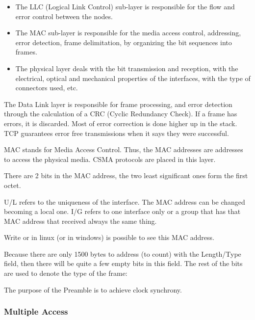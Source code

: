 \begin{itemize}
    \item The LLC (Logical Link Control) sub-layer is responsible
    for the flow and error control between the nodes.
    \item The MAC sub-layer is responsible for the media
    access control, addressing, error detection, frame
    delimitation, by organizing the bit sequences into
    frames.
    \item The physical layer deals with the bit transmission
    and reception, with the electrical, optical and
    mechanical properties of the interfaces, with the type
    of connectors used, etc.
\end{itemize}


The Data Link layer is responsible for frame processing, and error detection through the calculation of a CRC (Cyclic Redundancy Check). If a frame has errors, it is discarded.
Most of error correction is done higher up in the stack. TCP guarantees error free transmissions when it says they were successful.

MAC stands for Media Access Control. Thus, the MAC addresses are addresses to access the physical media. CSMA protocols are placed in this layer. 

There are 2 bits in the MAC address, the two least significant ones form the first octet.


U/L refers to the uniqueness of the interface. The MAC address can be changed becoming a local one. I/G refers to one interface only or a group that has that MAC address that received always the same thing. 

Write  or  in linux (or  in windows) is possible to see this MAC address.




Because there are only 1500 bytes to address (to count) with the Length/Type field, then there will be quite a few empty bits in this field. The rest of the bits are used to denote the type of the frame: 




The purpose of the Preamble is to achieve clock synchrony.





\subsubsection{Multiple Access}

